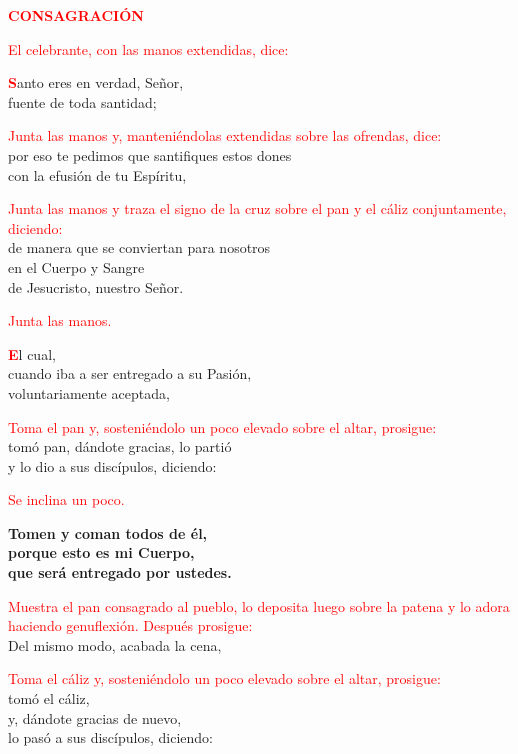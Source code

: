 \documentclass[12pt, letterpaper, spanish]{article}
\begin{document}
  \Large {\bfseries \textcolor{red}{CONSAGRACI\'ON}} 

  \large{\textcolor{red}{El celebrante, con las manos extendidas, dice:}}

  \lettrine[lines=2]{\bfseries \textcolor{red}{S}}{}\Large anto eres en verdad, Se\~nor,\\
  fuente de toda santidad;

  \large{\textcolor{red}{Junta las manos y, manteni\'endolas extendidas sobre las ofrendas, dice:}}\\
  \Large por eso te pedimos que santifiques estos dones\\
  con la efusi\'on de tu Esp\'iritu,

  \large{\textcolor{red}{Junta las manos y traza el signo de la cruz sobre el pan y el c\'aliz conjuntamente, diciendo:}}\\
  \Large de manera que se conviertan para nosotros\\
  en el Cuerpo y \Huge{\textcolor{red}{}} \Large Sangre\\
  de Jesucristo, nuestro Se\~nor.

  \large{\textcolor{red}{Junta las manos.}}

  \lettrine[lines=2]{\bfseries \textcolor{red}{E}}{}\Large l cual,\\
  cuando iba a ser entregado a su Pasi\'on,\\
  voluntariamente aceptada,

  \large{\textcolor{red}{Toma el pan y, sosteni\'endolo un poco elevado sobre el altar, prosigue:}}\\
  \Large tom\'o pan, d\'andote gracias, lo parti\'o\\
  y lo dio a sus disc\'ipulos, diciendo:

  \large{\textcolor{red}{Se inclina un poco.}} 

  \noindent
  \LARGE{ \bfseries{ Tomen y coman todos de \'el,\\
  porque esto es mi Cuerpo,\\
  que ser\'a entregado por ustedes.}}

  \large{\textcolor{red}{Muestra el pan consagrado al pueblo, lo deposita luego sobre la patena y lo adora haciendo genuflexi\'on. Despu\'es prosigue:}}\\
  \Large Del mismo modo, acabada la cena,

  \large{\textcolor{red}{Toma el c\'aliz y, sosteni\'endolo un poco elevado sobre el altar, prosigue:}}\\
  \Large tom\'o el c\'aliz,\\
  y, d\'andote gracias de nuevo,\\
  lo pas\'o a sus disc\'ipulos, diciendo:
\end{document}
